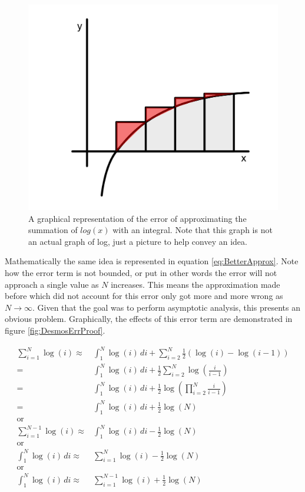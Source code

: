 \documentclass{article}
\begin{document}
\begin{figure}[h]
    \center
    \includegraphics[scale=0.4]{img/LogApprox.png}
    \caption{A graphical representation of the error of approximating the summation of $log(x)$ with an integral. Note that this graph is not an actual graph of log, just a picture to help convey an idea.}
    \label{fig:LogApprox}
\end{figure}

Mathematically the same idea is represented in equation \ref{eq:BetterApprox}. Note how the error term is not bounded, or put in other words the error will not approach a single value as $N$ increases. This means the approximation made before which did not account for this error only got more and more wrong as $N\to \infty$. Given that the goal was to perform asymptotic analysis, this presents an obvious problem. Graphically, the effects of this  error term are demonstrated in figure \ref{fig:DesmosErrProof}.


\begin{equation}
	\begin{split}
		\sum_{i=1}^N \log(i)
		\approx &
		\int_{1}^N \log(i) \,di+\sum_{i=2}^N \frac{1}{2}(\log(i)-\log(i-1))
		\\
		= &
		\int_{1}^N \log(i) \,di+\frac{1}{2} \sum_{i=2}^N \log\left(\frac{i}{i-1}\right)
		\\
		= &
		\int_{1}^N \log(i) \,di+\frac{1}{2} \log\left( \prod_{i=2}^N \frac{i}{i-1} \right)
		\\
		= &
		\int_{1}^N \log(i) \,di+\frac{1}{2} \log\left( N \right)
		\\
		\text{or}
		\\
		\sum_{i=1}^{N-1} \log(i)
		\approx &
		\int_{1}^N \log(i) \,di-\frac{1}{2} \log\left( N \right)
		\\
		\text{or}
		\\
		\int_{1}^N \log(i) \,di
		\approx &
		\sum_{i=1}^N \log(i)-\frac{1}{2}\log(N)
		\\
		\text{or}
		\\
		\int_{1}^N \log(i) \,di
		\approx &
		\sum_{i=1}^{N-1} \log(i)+\frac{1}{2}\log(N)
	\end{split}
	\label{eq:BetterApprox}
\end{equation}
\end{document}
